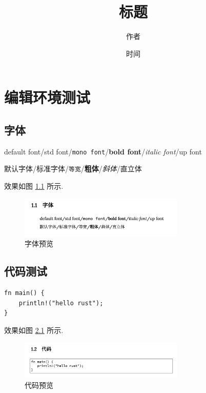 ﻿



\title{标题}
\author{作者}
\date{时间}
\maketitle
\thispagestyle{empty}
\tableofcontents

\mainmatter

\part{编辑环境测试}

\chapter{字体}

default font/\textmd{std font}/\texttt{mono font}/\textbf{bold font}/\textit{italic font}/\textup{up font}

默认字体/\textmd{标准字体}/\texttt{等宽}/\textbf{粗体}/\textit{斜体}/\textup{直立体}

效果如图 \ref{fig:env_font} 所示.

\begin{figure}[H]
    \centerline{\includegraphics[width=0.7\textwidth]{assets/imgs/env_font.png}}
    \caption{字体预览}
    \label{fig:env_font}
\end{figure}

\chapter{代码测试}

\begin{lstlisting}[style=verb]
fn main() {
    println!("hello rust");
}
\end{lstlisting}

效果如图 \ref{fig:env_code} 所示.
\begin{figure}[H]
    \centerline{\includegraphics[width=0.7\textwidth]{assets/imgs/env_code.png}}
    \caption{代码预览}
    \label{fig:env_code}
\end{figure}

\label{last_page_num}

